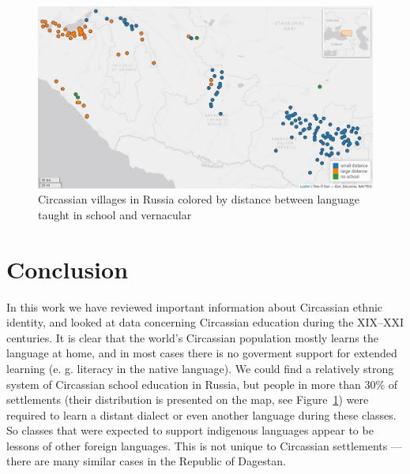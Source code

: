 \begin{figure}[t]
\includegraphics[width=\linewidth]{2_map_1100_600.jpeg}
\caption{Circassian villages in Russia colored by distance between language taught in school and vernacular}
\label{fig:map}
\end{figure} 

\section{Conclusion}
In this work we have reviewed important information about Circassian ethnic identity, and looked at data concerning Circassian education during the XIX--XXI centuries. It is clear that the world’s Circassian population mostly learns the language at home, and in most cases there is no goverment support for extended learning (e. g. literacy in the native language). We could find a relatively strong system of Circassian school education in Russia, but people in more than 30\% of settlements (their distribution is presented on the map, see Figure~\ref{fig:map}) were required to learn a distant dialect or even another language during these classes. So classes that were expected to support indigenous languages appear to be lessons of other foreign languages. This is not unique to Circassian settlements --- there are many similar cases in the Republic of Dagestan.
\vfill



